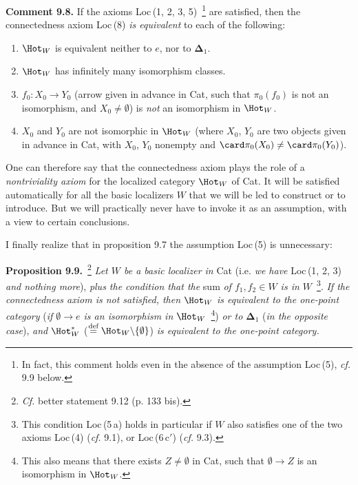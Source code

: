 \textbf{Comment 9.8.} If the axioms Loc\,(1, 2, 3, 5)~\footnote[52]{In fact, this comment holds even in the absence of the assumption Loc\,(5), \textit{cf.} 9.9 below.} are satisfied, then the connectedness axiom Loc\,(8) \textit{is equivalent} to each of the following:

\begin{enumerate}[leftmargin=*]
\item[\textit{a})] $\Hot_W$ is equivalent neither to $e$, nor to $\boldsymbol{\Delta}_1$.
\item[\textit{b})] $\Hot_W$ has infinitely many isomorphism classes.
\item[\textit{c})] $f_0:X_0\longrightarrow Y_0$ (arrow given in advance in Cat, such that $\pi_0(f_0)$ is not an isomorphism, and $X_0\neq\emptyset$) is \textit{not} an isomorphism in $\Hot_W$.
\item[\textit{d})] $X_0$ and $Y_0$ are not isomorphic in $\Hot_W$ (where $X_0$, $Y_0$ are two objects given in advance in Cat, with $X_0$, $Y_0$ nonempty and $\card\pi_0(X_0)\neq\card\pi_0(Y_0)$).
\end{enumerate}

\marginbar One can therefore say that the connectedness axiom plays the role of a \textit{nontriviality axiom} for the localized category $\Hot_W$ of Cat. It will be satisfied automatically for all the basic localizers $W$ that we will be led to construct or to introduce. But we will practically never have to invoke it as an assumption, with a view to certain conclusions.

I finally realize that in proposition 9.7 the assumption Loc\,(5) is unnecessary:

\textbf{Proposition 9.9.}~\footnote[53]{\textit{Cf.} better statement 9.12 (p. 133 bis).} \textit{Let $W$ be a basic localizer in} Cat (i.e. \textit{we have} Loc\,(1, 2, 3) \textit{and nothing more}), \textit{plus the condition that the} sum \textit{of $f_1,f_2\in W$ is in $W$}~\footnote[54]{This condition Loc\,(5\,a) holds in particular if $W$ also satisfies one of the two axioms Loc\,(4) (\textit{cf.} 9.1), or Loc\,(6\,c$'$) (\textit{cf.} 9.3).}. \textit{If the connectedness axiom is not satisfied, then} $\Hot_W$ \textit{is equivalent to the one-point category} (\textit{if $\emptyset\longrightarrow e$ is an isomorphism in} $\Hot_W$~\footnote[55]{This also means that there exists $Z\neq\emptyset$ in Cat, such that $\emptyset\longrightarrow Z$ is an isomorphism in $\Hot_W$.}) \textit{or to $\boldsymbol{\Delta}_1$} (\textit{in the opposite case}), \textit{and} $\Hot_W^*$ ($\overset{\text{def}}{=}\Hot_W\backslash\{\emptyset\}$) \textit{is equivalent to the one-point category.}

